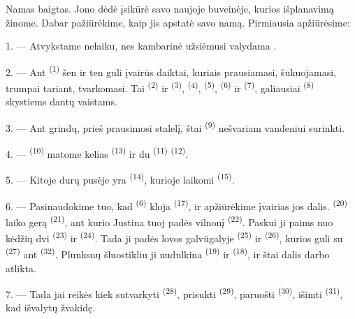 Namas baigtas. Jono dėdė įsikūrė savo naujoje buveinėje, kurios išplanavimą žinome.
Dabar pažiūrėkime, kaip jis apstatė savo namą. Pirmiausia apžiūrėsime:

\VUsaut{3.0mm}

1. --- Atvykstame nelaiku, nes kambarinė užsiėmusi valydama .

2. --- Ant  \textsuperscript{(1)} šen ir ten guli įvairūs
daiktai, kuriais prausiamasi, šukuojamasi, trumpai tariant, tvarkomasi. Tai
 \textsuperscript{(2)} ir  \textsuperscript{(3)},
 \textsuperscript{(4)},  \textsuperscript{(5)},
 \textsuperscript{(6)} ir  \textsuperscript{(7)},
galiausiai  \textsuperscript{(8)} skystiems dantų vaistams.

3. --- Ant grindų, prieš prausimosi stalelį, štai 
\textsuperscript{(9)} nešvariam vandeniui surinkti.

4. ---  \textsuperscript{(10)} matome kelias 
\textsuperscript{(13)} ir du  \textsuperscript{(11)}
 \textsuperscript{(12)}.

5. --- Kitoje durų pusėje yra  \textsuperscript{(14)},
kurioje laikomi  \textsuperscript{(15)}.

6. --- Pasinaudokime tuo, kad  \textsuperscript{(6)} kloja
 \textsuperscript{(17)}, ir apžiūrėkime įvairias jos dalis.  \textsuperscript{(20)} laiko gerą 
\textsuperscript{(21)}, ant kurio Justina tuoj padės vilnonį 
\textsuperscript{(22)}. Paskui ji paims nuo kėdžių dvi 
\textsuperscript{(23)} ir  \textsuperscript{(24)}. Tada ji padės
lovos galvūgalyje  \textsuperscript{(25)} ir
 \textsuperscript{(26)}, kurios guli su 
\textsuperscript{(27)} ant  \textsuperscript{(32)}. Plunksnų
šluostikliu ji nudulkina  \textsuperscript{(19)} ir  \textsuperscript{(18)}, ir štai dalis darbo atlikta.

7. --- Tada jai reikės kiek sutvarkyti 
\textsuperscript{(28)}, prisukti  \textsuperscript{(29)}, paruošti
 \textsuperscript{(30)}, išimti 
\textsuperscript{(31)}, kad išvalytų žvakidę.

